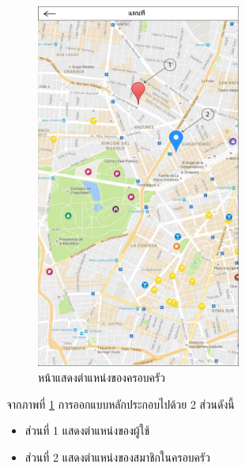 		\begin{figure}[H]
			\centering
			\includegraphics[width=0.6\textwidth]{Figures/3/UI/maps}
			\caption{หน้าแสดงตำแหน่งของครอบครัว}
			\label{Fig:แผนที่}
		\end{figure}
		จากภาพที่ \ref{Fig:แผนที่} การออกแบบหลักประกอบไปด้วย 2 ส่วนดังนี้
		\begin{itemize}
			\item ส่วนที่ 1 แสดงตำแหน่งของผู้ใช้
			\item ส่วนที่ 2 แสดงตำแหน่งของสมาชิกในครอบครัว
		\end{itemize}


